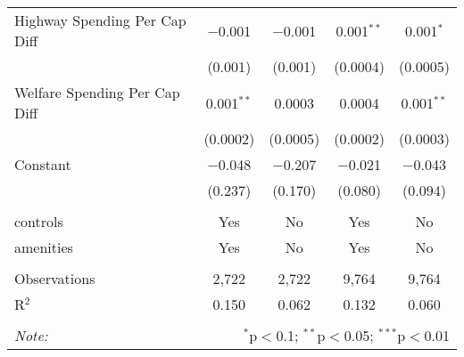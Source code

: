 \begin{table}[!htbp]
\begin{tabular}{@{\extracolsep{5pt}}lcccc}
  Highway Spending Per Cap Diff & $-$0.001 & $-$0.001 & 0.001$^{**}$ & 0.001$^{*}$ \\ 
  & (0.001) & (0.001) & (0.0004) & (0.0005) \\ 
  Welfare Spending Per Cap Diff & 0.001$^{**}$ & 0.0003 & 0.0004 & 0.001$^{**}$ \\ 
  & (0.0002) & (0.0005) & (0.0002) & (0.0003) \\ 
  Constant & $-$0.048 & $-$0.207 & $-$0.021 & $-$0.043 \\ 
  & (0.237) & (0.170) & (0.080) & (0.094) \\ 
 \hline \\[-1.8ex] 
controls & Yes & No & Yes & No \\ 
amenities & Yes & No & Yes & No \\ 
\hline \\[-1.8ex] 
Observations & 2,722 & 2,722 & 9,764 & 9,764 \\ 
R$^{2}$ & 0.150 & 0.062 & 0.132 & 0.060 \\ 
\hline 
\hline \\[-1.8ex] 
\textit{Note:}  & \multicolumn{4}{r}{$^{*}$p$<$0.1; $^{**}$p$<$0.05; $^{***}$p$<$0.01} \\ 
\end{tabular} 
\end{table} 
